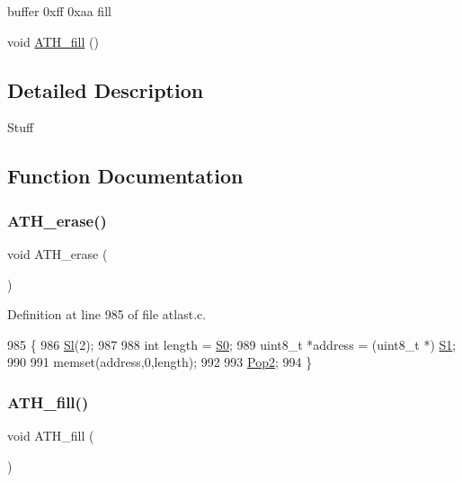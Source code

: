 buffer 0xff 0xaa fill



 \begin{DoxyCompactItemize}
\item 
void \hyperlink{group__Bill_ga67975f3222fec3ffefd7ba74669464bb}{A\+T\+H\+\_\+fill} ()
\end{DoxyCompactItemize}


\subsection{Detailed Description}
Stuff 

\subsection{Function Documentation}
\mbox{\label{group__Bill_ga41d39e0bc8285a793b78ca6c6a254094}} 
\subsubsection{\texorpdfstring{A\+T\+H\+\_\+erase()}{ATH\_erase()}}
{\footnotesize\ttfamily void A\+T\+H\+\_\+erase (\begin{DoxyParamCaption}{ }\end{DoxyParamCaption})}



Definition at line 985 of file atlast.\+c.


\begin{DoxyCode}
985                  \{
986     \hyperlink{atldef_8h_a5926d5feea48dfae9eef1fb4e2bdb5fa}{Sl}(2);
987 
988     \textcolor{keywordtype}{int} length = \hyperlink{atldef_8h_a5cfab9793f7fd3ac4ab45eff41df9f37}{S0};
989     uint8\_t *address = (uint8\_t *) \hyperlink{atldef_8h_a690d30e9ad3647835c243368b36d4c41}{S1};
990 
991     memset(address,0,length);
992 
993     \hyperlink{atldef_8h_aa25c480f1a1ad10fdb756d8fd02a98ea}{Pop2};
994 \}
\end{DoxyCode}
\mbox{\label{group__Bill_ga67975f3222fec3ffefd7ba74669464bb}} 
\subsubsection{\texorpdfstring{A\+T\+H\+\_\+fill()}{ATH\_fill()}}
{\footnotesize\ttfamily void A\+T\+H\+\_\+fill (\begin{DoxyParamCaption}{ }\end{DoxyParamCaption})}



